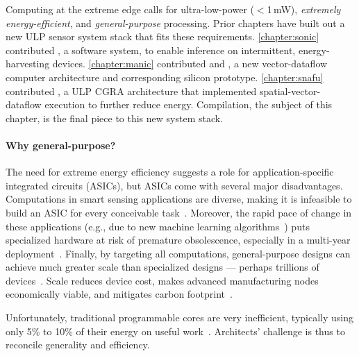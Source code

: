 Computing at the extreme edge
calls for ultra-low-power ($<$1\,mW),
\emph{extremely energy-efficient},
and \emph{general-purpose} processing.
% 
Prior chapters have built out a new ULP sensor system stack that fits these requirements.
% 
\autoref{chapter:sonic} contributed \sonic, a software system, to enable inference on intermittent, energy-harvesting devices.
%
\autoref{chapter:manic} contributed \manic and \msilicon, a new vector-dataflow computer architecture and corresponding silicon prototype.
%
\autoref{chapter:snafu} contributed \snafu, a ULP CGRA architecture that implemented spatial-vector-dataflow execution to further reduce energy.
% 
Compilation, the subject of this chapter, is the final piece to this new system stack.

\paragraph{Why general-purpose?} 
The need for extreme energy efficiency suggests a role for
application-specific integrated circuits (ASICs), but ASICs
come with several major disadvantages.
%
Computations in smart sensing applications are diverse, making it is
infeasible to build an ASIC for every conceivable task~\cite{edge-offload,moonwalk}.
%
Moreover, the rapid pace of change in these applications (e.g., due to
new machine learning algorithms~\cite{jouppi2021ten})
puts specialized hardware at risk of premature obsolescence, especially in
a multi-year deployment~\cite{edge-offload}.
%
Finally, by targeting all computations, general-purpose designs
can achieve much greater scale than specialized designs --- perhaps trillions of devices~\cite{arm-trillions}.
% 
Scale reduces device cost,
makes advanced manufacturing nodes economically viable,
and mitigates carbon footprint~\cite{gupta2022chasing}.

Unfortunately, traditional programmable cores are very inefficient,
typically using only 5\% to 10\% of their energy on useful work~\cite{manic,snafu,horowitz:isscc14:energy-keynote}.
%
Architects' challenge is thus to reconcile generality and efficiency.

